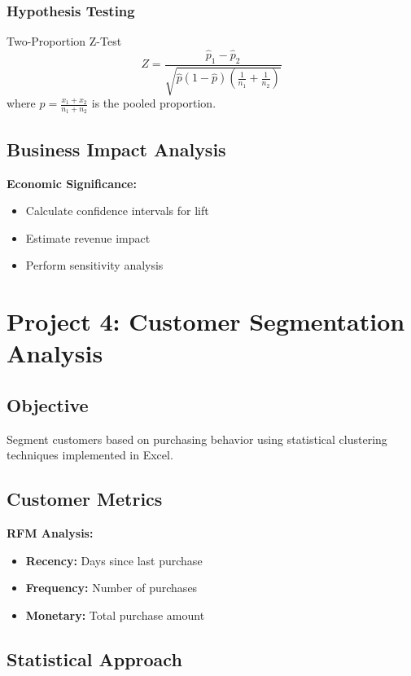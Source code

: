\documentclass[12pt,a4paper]{book}
\begin{document}
{{\subsubsection{Hypothesis Testing}

\begin{definition}{Two-Proportion Z-Test}
\[
Z = \frac{\hat{p}_1 - \hat{p}_2}{\sqrt{\hat{p}(1-\hat{p})\left(\frac{1}{n_1} + \frac{1}{n_2}\right)}}
\]
where $\hat{p} = \frac{x_1 + x_2}{n_1 + n_2}$ is the pooled proportion.
\end{definition}

\subsection{Business Impact Analysis}

\textbf{Economic Significance:}
\begin{itemize}
    \item Calculate confidence intervals for lift
    \item Estimate revenue impact
    \item Perform sensitivity analysis
\end{itemize}

\section{Project 4: Customer Segmentation Analysis}

\subsection{Objective}

Segment customers based on purchasing behavior using statistical clustering techniques implemented in Excel.

\subsection{Customer Metrics}

\textbf{RFM Analysis:}
\begin{itemize}
    \item \textbf{Recency:} Days since last purchase
    \item \textbf{Frequency:} Number of purchases
    \item \textbf{Monetary:} Total purchase amount
\end{itemize}

\subsection{Statistical Approach}

}}
\end{document}
